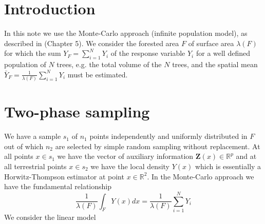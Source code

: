 \documentclass[a4paper,12pt,leqno, titlepage]{article}
\newcommand{\R}{\mathbb{R}}
\begin{document}
\section{Introduction}\label{intro}
 \setcounter{page}{1}
In this note we use the Monte-Carlo approach (infinite population model), as described in \cite{mandallaz} (Chapter 5). We consider the forested area $F$ of surface area $\lambda(F)$ for which the sum $Y_F=\sum_{i=1}^N Y_i$ of the response variable $Y_i$ for a well defined population of $N$ trees, e.g. the total volume of the $N$ trees, and the spatial mean $\bar{Y}_F=\frac{1}{\lambda(F)}\sum_{i=1}^N Y_i$ must be estimated.

\section{Two-phase sampling}\label{twophase}
We have a sample $s_1$ of $n_1$ points independently and uniformly distributed in $F$ out of which $n_2$ are selected by simple random sampling without replacement. At all points $x\in{s_{1}}$ we have the vector of auxiliary information $\pmb{Z}(x)\in{\R^p}$ and at all terrestrial points $x\in{s_{2}}$  we have the local density $Y(x)$ which is essentially a Horwitz-Thompson estimator at point $x\in{\R^2}$. In the Monte-Carlo approach we have the fundamental relationship
   \begin{equation}\label{montecarlo}
   \frac{1}{\lambda(F)}\int_F Y(x)dx=\frac{1}{\lambda(F)}\sum_{i=1}^NY_i
   \end{equation}
    We consider the linear model
\end{document}
